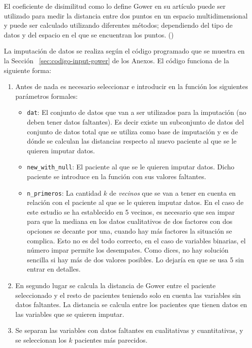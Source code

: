 El coeficiente de disimilitud como lo define Gower en su artículo puede ser utilizado para medir la distancia entre dos puntos en un espacio multidimensional y puede ser calculado utilizando diferentes métodos; dependiendo del tipo de datos y del espacio en el que se encuentran los puntos. (\cite{Gower1971})

La imputación de datos se realiza según el código programado que se muestra en la Sección ~\ref{sec:codigo-input-gower} {\color{blue} de los Anexos}. El código funciona de la siguiente forma: 
\begin{enumerate}
    \item Antes de nada es necesario seleccionar e introducir en la función los siguientes parámetros formales: 
    \begin{itemize}
        \item \texttt{dat}: El conjunto de datos que van a ser utilizados para la imputación (no deben tener datos faltantes). Es decir existe un subconjunto de datos del conjunto de datos total que se utiliza como base de imputación y es de dónde se calculan las distancias respecto al nuevo paciente al que se le quieren imputar datos.
        \item \texttt{new\_with\_null}: El paciente al que se le quieren imputar datos. Dicho paciente se introduce en la función con sus valores faltantes.
        \item \texttt{n\_primeros}: La cantidad $k$ de \textit{vecinos} que se van a tener en cuenta en relación con el paciente al que se le quieren imputar datos. En el caso de este estudio se ha establecido en 5 vecinos{\color{red}, es necesario que sea impar para que la mediana en los datos cualitativos de dos factores con dos opciones se decante por una, cuando hay más factores la situación se complica.} {\color{blue} Esto no es del todo correcto, en el caso de variables binarias, el número impar permite los desempates. Como dices, no hay solución sencilla si hay más de dos valores posibles. Lo dejaría en que se usa 5 sin entrar en detalles.} 
    \end{itemize}
    \item En segundo lugar se calcula la distancia de Gower entre el paciente seleccionado y el resto de pacientes teniendo solo en cuenta las variables sin datos faltantes. La distancia se calcula entre los pacientes que tienen datos en las variables que se quieren imputar.
    \item Se separan las variables con datos faltantes en cualitativas y cuantitativas, y se seleccionan los $k$ pacientes más parecidos.

\end{enumerate}
